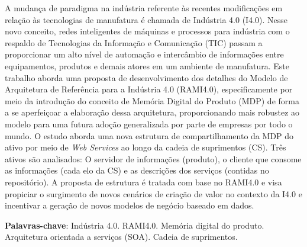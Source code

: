 \setlength{\absparsep}{18pt} %
\begin{resumo}
	A mudança de paradigma na indústria referente às recentes modificações em relação às tecnologias de manufatura é chamada de Indústria 4.0 (I4.0). Nesse novo conceito, redes inteligentes de máquinas e processos para indústria com o respaldo de Tecnologias da Informação e Comunicação (TIC) passam a proporcionar um alto nível de automação e intercâmbio de informações entre equipamentos, produtos e demais atores em um ambiente de manufatura.
	Este trabalho aborda uma proposta de desenvolvimento dos detalhes do Modelo de Arquitetura de Referência para a Indústria 4.0 (RAMI4.0), especificamente por meio da introdução do conceito de Memória Digital do Produto (MDP) de forma a se aperfeiçoar a elaboração dessa arquitetura, proporcionando mais robustez ao modelo para uma futura adoção generalizada por parte de empresas por todo o mundo.
	O estudo aborda uma nova estrutura de compartilhamento da MDP do ativo por meio de \textit{Web Services} ao longo da cadeia de suprimentos (CS). Três ativos são analisados: O servidor de informações (produto), o cliente que consome as informações (cada elo da CS) e as descrições dos serviços (contidas no repositório).
	A proposta de estrutura é tratada com base no RAMI4.0 e visa propiciar o surgimento de novos cenários de criação de valor no contexto da I4.0 e incentivar a geração de novos modelos de negócio baseado em dados.

	\vspace{\onelineskip}

	\noindent
	\textbf{Palavras-chave}: Indústria 4.0. RAMI4.0. Memória digital do produto. Arquitetura orientada a serviços (SOA). Cadeia de suprimentos.
\end{resumo}

